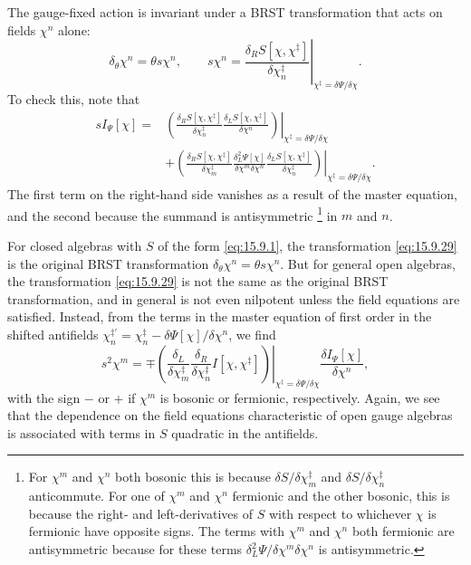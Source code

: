 The gauge-fixed action is invariant under a BRST transformation that acts on
fields $\chi^n$ alone:
\begin{equation}
\delta_\theta\chi^n=\theta s\chi^n,
\qquad
s\chi^n=\left.
\frac{\delta_R S[\chi,\chi^{\ddagger}]}{\delta\chi_n^{\ddagger}}
\right|_{\chi^{\ddagger}=\delta\Psi/\delta\chi}.
\tag{15.9.29}\label{eq:15.9.29}
\end{equation}
To check this, note that
\begin{align*}
sI_\Psi[\chi]
={}&\left.
\left(
\frac{\delta_R S[\chi,\chi^{\ddagger}]}{\delta\chi_n^{\ddagger}}
\frac{\delta_L S[\chi,\chi^{\ddagger}]}{\delta\chi^n}
\right)\right|_{\chi^{\ddagger}=\delta\Psi/\delta\chi}
\\
&+\left.
\left(
\frac{\delta_R S[\chi,\chi^{\ddagger}]}{\delta\chi_m^{\ddagger}}
\frac{\delta_L^2\Psi[\chi]}{\delta\chi^m\delta\chi^n}
\frac{\delta_L S[\chi,\chi^{\ddagger}]}{\delta\chi_n^{\ddagger}}
\right)\right|_{\chi^{\ddagger}=\delta\Psi/\delta\chi}.
\end{align*}
The first term on the right-hand side vanishes as a result of the master
equation, and the second because the summand is antisymmetric
\footnote{For $\chi^m$ and $\chi^n$ both bosonic this is because
$\delta S/\delta\chi_m^{\ddagger}$ and
$\delta S/\delta\chi_n^{\ddagger}$ anticommute. For one of $\chi^m$ and
$\chi^n$ fermionic and the other bosonic, this is because the right- and
left-derivatives of $S$ with respect to whichever $\chi$ is fermionic have
opposite signs. The terms with $\chi^m$ and $\chi^n$ both fermionic are
antisymmetric because for these terms
$\delta_L^2\Psi/\delta\chi^m\delta\chi^n$ is antisymmetric.}
in $m$ and $n$.

For closed algebras with $S$ of the form \eqref{eq:15.9.1}, the transformation
\eqref{eq:15.9.29} is the original BRST transformation
$\delta_\theta\chi^n=\theta s\chi^n$. But for general open algebras, the
transformation \eqref{eq:15.9.29} is not the same as the original BRST
transformation, and in general is not even nilpotent unless the field equations
are satisfied. Instead, from the terms in the master equation of first order
in the shifted antifields
$\chi_n^{\ddagger\prime}=\chi_n^{\ddagger}-\delta\Psi[\chi]/\delta\chi^n$,
we find
\begin{equation}
s^2\chi^m
=\mp\left.
\left(
\frac{\delta_L}{\delta\chi_m^{\ddagger}}
\frac{\delta_R}{\delta\chi_n^{\ddagger}}I[\chi,\chi^{\ddagger}]
\right)\right|_{\chi^{\ddagger}=\delta\Psi/\delta\chi}
\frac{\delta I_\Psi[\chi]}{\delta\chi^n},
\tag{15.9.30}\label{eq:15.9.30}
\end{equation}
with the sign $-$ or $+$ if $\chi^m$ is bosonic or fermionic, respectively.
Again, we see that the dependence on the field equations characteristic of
open gauge algebras is associated with terms in $S$ quadratic in the
antifields.

